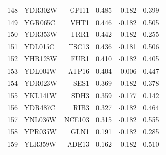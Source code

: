 \begin{longtable}{rlrrrr}
148 & YDR302W & GPI11 & 0.485 & -0.182 & 0.399\\
149 & YGR065C & VHT1 & 0.446 & -0.182 & 0.505\\
150 & YDR353W & TRR1 & 0.442 & -0.182 & 0.255\\
151 & YDL015C & TSC13 & 0.436 & -0.181 & 0.506\\
152 & YHR128W & FUR1 & 0.410 & -0.182 & 0.405\\
153 & YDL004W & ATP16 & 0.404 & -0.006 & 0.447\\
154 & YDR023W & SES1 & 0.369 & -0.182 & 0.378\\
155 & YKL141W & SDH3 & 0.359 & -0.177 & 0.142\\
156 & YDR487C & RIB3 & 0.327 & -0.182 & 0.464\\
157 & YNL036W & NCE103 & 0.315 & -0.182 & 0.555\\
158 & YPR035W & GLN1 & 0.191 & -0.182 & 0.285\\
159 & YLR359W & ADE13 & 0.162 & -0.182 & 0.510\\
\hline
\end{longtable}
